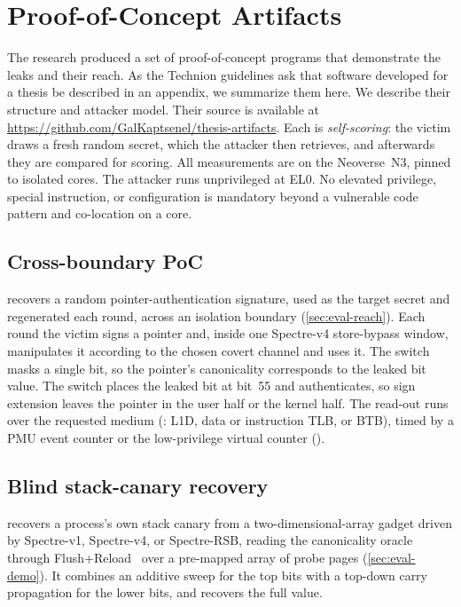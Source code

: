 \chapter{Proof-of-Concept Artifacts}
\label{appendix:pocs}

The research produced a set of proof-of-concept programs that demonstrate the leaks and their
reach. As the Technion guidelines ask that software developed for a thesis be described in an
appendix, we summarize them here. We describe their structure and attacker model. Their source is
available at \url{https://github.com/GalKaptsenel/thesis-artifacts}. Each is \emph{self-scoring}:
the victim draws a fresh random secret, which the attacker then retrieves, and afterwards they are
compared for scoring. All measurements are on the Neoverse~N3, pinned to isolated cores. The attacker runs
unprivileged at EL0. No elevated privilege, special instruction, or configuration is mandatory
beyond a vulnerable code pattern and co-location on a core.

\section{Cross-boundary PoC}
\label{app:poc-xboundary}

 recovers a
random pointer-authentication signature, used as the target secret and regenerated each round,
across an isolation boundary (\autoref{sec:eval-reach}). Each round the victim signs a pointer and,
inside one Spectre-v4 store-bypass window, manipulates it according to the chosen covert channel and
uses it. The  switch masks a single bit, so the pointer's canonicality corresponds to the
leaked bit value. The  switch places the leaked bit at bit~55 and authenticates, so sign
extension leaves the pointer in the user half or the kernel half. The read-out runs over the
requested medium (: L1D, data or instruction TLB, or BTB), timed by a PMU event
counter or the low-privilege  virtual counter ().

\section{Blind stack-canary recovery}
\label{app:poc-canary}

 recovers a process's own stack canary from a
two-dimensional-array gadget driven by Spectre-v1, Spectre-v4, or Spectre-RSB, reading the
canonicality oracle through Flush+Reload~\cite{flushreload} over a pre-mapped array of probe pages
(\autoref{sec:eval-demo}). It combines an additive sweep for the top bits with a top-down carry
propagation for the lower bits, and recovers the full \reg{[55:0]} value.

